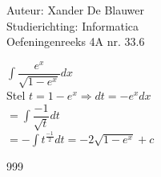 \documentclass[a4paper]{article}
\begin{document}
\noindent \large Auteur: Xander De Blauwer \\
\noindent \large Studierichting: Informatica\\
\noindent \large Oefeningenreeks 4A nr. 33.6\\

\medskip

\normalsize


$ \displaystyle\int \dfrac{e^x}{\sqrt{1-e^x}}dx $ \\

Stel $t = 1 - e^x \Rightarrow dt = -e^xdx $ \\

$ = \displaystyle\int \dfrac{-1}{\sqrt{t}}dt $ \\

$ = -\displaystyle\int t^{\tfrac{-1}{2}}dt = -2\sqrt{1-e^x} + c $ \\




\begin{thebibliography}{999}
\end{thebibliography}
\end{document}
